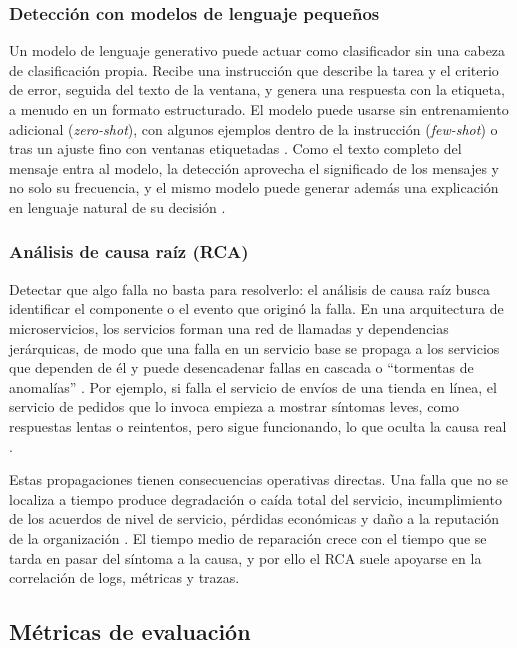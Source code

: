 \subsubsection{Detección con modelos de lenguaje pequeños}\label{sec:mt_deteccion_slm}

Un modelo de lenguaje generativo puede actuar como clasificador sin una cabeza de clasificación propia. Recibe una instrucción que describe la tarea y el criterio de error, seguida del texto de la ventana, y genera una respuesta con la etiqueta, a menudo en un formato estructurado. El modelo puede usarse sin entrenamiento adicional (\textit{zero-shot}), con algunos ejemplos dentro de la instrucción (\textit{few-shot}) o tras un ajuste fino con ventanas etiquetadas \cite{liu2024_logprompt}. Como el texto completo del mensaje entra al modelo, la detección aprovecha el significado de los mensajes y no solo su frecuencia, y el mismo modelo puede generar además una explicación en lenguaje natural de su decisión \cite{lim2025_logadreft}.

\subsubsection{Análisis de causa raíz (RCA)}\label{sec:mt_rca}

Detectar que algo falla no basta para resolverlo: el análisis de causa raíz busca identificar el componente o el evento que originó la falla. En una arquitectura de microservicios, los servicios forman una red de llamadas y dependencias jerárquicas, de modo que una falla en un servicio base se propaga a los servicios que dependen de él y puede desencadenar fallas en cascada o ``tormentas de anomalías'' \cite{wang2024_rca}. Por ejemplo, si falla el servicio de envíos de una tienda en línea, el servicio de pedidos que lo invoca empieza a mostrar síntomas leves, como respuestas lentas o reintentos, pero sigue funcionando, lo que oculta la causa real \cite{pedroso2025_maia}.

Estas propagaciones tienen consecuencias operativas directas. Una falla que no se localiza a tiempo produce degradación o caída total del servicio, incumplimiento de los acuerdos de nivel de servicio, pérdidas económicas y daño a la reputación de la organización \cite{wang2024_rca}. El tiempo medio de reparación crece con el tiempo que se tarda en pasar del síntoma a la causa, y por ello el RCA suele apoyarse en la correlación de logs, métricas y trazas.

\subsection{Métricas de evaluación}\label{sec:mt_metricas}


